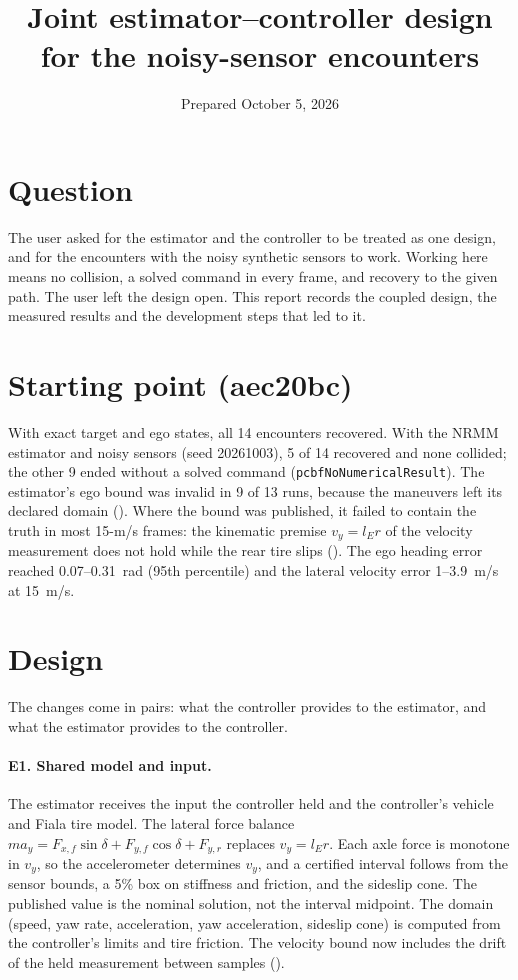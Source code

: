 \documentclass[11pt]{article}
\title{Joint estimator--controller design for the noisy-sensor encounters}
\date{Prepared October 5, 2026}
\begin{document}
\maketitle

\section{Question}
The user asked for the estimator and the controller to be treated as one
design, and for the encounters with the noisy synthetic sensors to work.
Working here means no collision, a solved command in every frame, and
recovery to the given path. The user left the design open. This report
records the coupled design, the measured results and the development steps
that led to it.

\section{Starting point (aec20bc)}
With exact target and ego states, all 14 encounters recovered. With the NRMM
estimator and noisy sensors (seed 20261003), 5 of 14 recovered and none
collided; the other 9 ended without a solved command
(\texttt{pcbfNoNumericalResult}). The estimator's ego bound was invalid in 9
of 13 runs, because the maneuvers left its declared domain
(). Where the bound was published, it
failed to contain the truth in most 15-m/s frames: the kinematic premise
$v_y=l_Er$ of the velocity measurement does not hold while the rear tire
slips (). The ego heading error reached
0.07--0.31~rad (95th percentile) and the lateral velocity error 1--3.9~m/s at
15~m/s.

\section{Design}
The changes come in pairs: what the controller provides to the estimator,
and what the estimator provides to the controller.

\paragraph{E1. Shared model and input.} The estimator receives the input the
controller held and the controller's vehicle and Fiala tire model. The
lateral force balance $m a_y=F_{x,f}\sin\delta+F_{y,f}\cos\delta+F_{y,r}$
replaces $v_y=l_Er$. Each axle force is monotone in $v_y$, so the
accelerometer determines $v_y$, and a certified interval follows from the
sensor bounds, a 5\% box on stiffness and friction, and the sideslip cone.
The published value is the nominal solution, not the interval midpoint. The
domain (speed, yaw rate, acceleration, yaw acceleration, sideslip cone) is
computed from the controller's limits and tire friction.
The velocity bound now includes the drift of the held measurement between
samples ().
\end{document}
